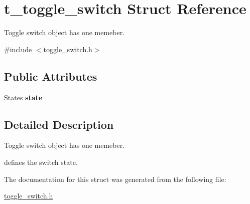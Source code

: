 \hypertarget{structt__toggle__switch}{}\section{t\+\_\+toggle\+\_\+switch Struct Reference}
\label{structt__toggle__switch}


Toggle switch object has one memeber.  




{\ttfamily \#include $<$toggle\+\_\+switch.\+h$>$}

\subsection*{Public Attributes}
\begin{DoxyCompactItemize}
\item 
\hyperlink{toggle__switch_8h_a808e5cd4979462d3bbe3070d7d147444}{States} {\bfseries state}\hypertarget{structt__toggle__switch_af94cce14bd44f032f240b18260f191f5}{}\label{structt__toggle__switch_af94cce14bd44f032f240b18260f191f5}

\end{DoxyCompactItemize}


\subsection{Detailed Description}
Toggle switch object has one memeber. 

defines the switch state. 

The documentation for this struct was generated from the following file\+:\begin{DoxyCompactItemize}
\item 
\hyperlink{toggle__switch_8h}{toggle\+\_\+switch.\+h}\end{DoxyCompactItemize}
